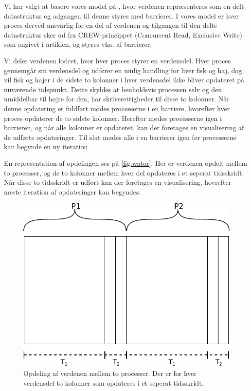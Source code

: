 Vi har valgt at basere vores model på \cite{crew}, hvor verdenen repræsenteres 
som en delt datastruktur og adgangen til denne styres med barrierer. I vores 
model er hver proces derved ansvarlig for en del af verdenen og tilgangen til 
den delte datastruktur sker ud fra CREW-princippet (Concurrent Read, Exclusive 
Write) som angivet i artiklen, og styres vha. af barrierer. 

Vi deler verdenen lodret, hvor hver proces styrer en verdensdel. Hver proces 
gennemgår sin verdensdel og udfører en mulig handling for hver fisk og haj, dog 
vil fisk og hajer i de sidste to kolonner i hver verdensdel ikke bliver 
opdateret på nuværende tidspunkt. Dette skyldes at henholdsvis processen selv 
og den umiddelbar til højre for den, har skriverettigheder til disse to 
kolonner.
Når denne opdatering er fuldført mødes processerne i en barriere, hvorefter 
hver proces opdaterer de to sidste kolonner. Herefter mødes processerne igen i 
barrieren, og når alle kolonner er opdateret, kan der foretages en 
visualisering af de udførte opdateringer. Til slut mødes alle i en barrierer igen før processerne kan begynde en ny iteration 

En representation af opdelingen ses på \autoref{fig:wator}. Her er verdenen 
opdelt mellem to processer, og de to kolonner mellem hver del opdateres i et 
seperat tidsskridt. Når disse to tidsskridt er udført kan der foretages en 
visualisering, hovrefter næste iteration af opdateringer kan begyndes.  


\begin{figure}
  \begin{center}
  \includegraphics[scale=0.75]{images/wator}
  \caption{Opdeling af verdenen mellem to processer. Der er for hver verdensdel 
  to kolonner som opdateres i et seperat tidsskridt.}
  \label{fig:wator}
  \end{center}
\end{figure}

